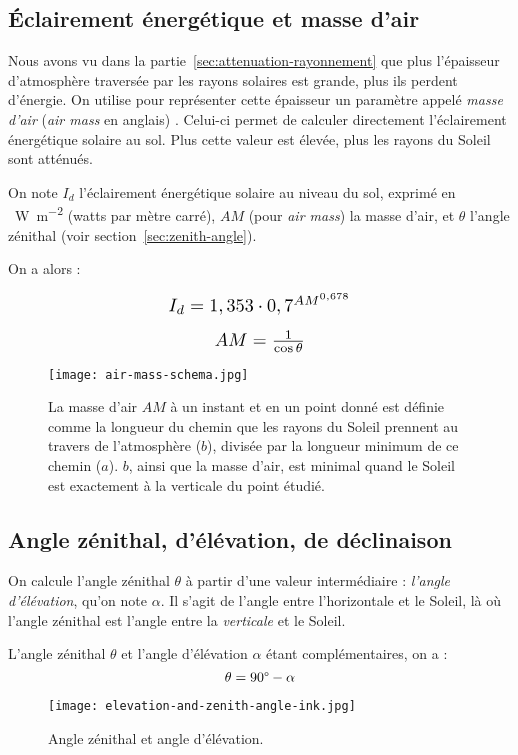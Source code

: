 \documentclass[12pt]{article}
\begin{document}
\subsection{Éclairement énergétique et masse d'air}

Nous avons vu dans la partie~\ref{sec:attenuation-rayonnement} que plus l'épaisseur d'atmosphère traversée par les rayons solaires est grande, plus ils perdent d'énergie.
On utilise pour représenter cette épaisseur un paramètre appelé \emph{masse d'air} (\textit{air mass} en anglais) \cite{air_mass_wiki}.
Celui-ci permet de calculer directement l'éclairement énergétique solaire au sol.
Plus cette valeur est élevée, plus les rayons du Soleil sont atténués.

On note $I_d$ l'éclairement énergétique solaire au niveau du sol, exprimé en \SI{}{\watt\per\square\meter} (watts par mètre carré), $AM$ (pour \emph{air mass}) la masse d'air, et $\theta$ l'angle zénithal (voir section~\ref{sec:zenith-angle}).

On a alors \cite{pos_air_mass} :

\[
	\scalebox{1.3}{
		$I_d = 1,353 \cdot 0,7^{{AM}^{0,678}}$
	}
\]

\[
	\scalebox{1.3}{
		$AM = \frac{1}{\cos \theta}$
	}
\]

\begin{figure}[H]
	\centerline{\texttt{[image: air-mass-schema.jpg]}}
	\caption{La masse d'air $AM$ à un instant et en un point donné est définie comme la longueur du chemin que les rayons du Soleil prennent au travers de l'atmosphère ($b$), divisée par la longueur minimum de ce chemin ($a$). $b$, ainsi que la masse d'air, est minimal quand le Soleil est exactement à la verticale du point étudié.}
	\label{fig:air-mass}
\end{figure}


\subsection{Angle zénithal, d'élévation, de déclinaison}
On calcule l'angle zénithal $\theta$ à partir d'une valeur intermédiaire : \emph{l'angle d'élévation}, qu'on note $\alpha$.
Il s'agit de l'angle entre l'horizontale et le Soleil, là où l'angle zénithal est l'angle entre la \emph{verticale} et le Soleil.

L'angle zénithal $\theta$ et l'angle d'élévation $\alpha$ étant complémentaires, on a :
\[
	\theta = 90\degree - \alpha
\]

 \begin{figure}[H]
	\centerline{\texttt{[image: elevation-and-zenith-angle-ink.jpg]}}
	\caption{Angle zénithal et angle d'élévation.}
	\label{fig:elevation-and-zenith-angle}
\end{figure}
\end{document}
